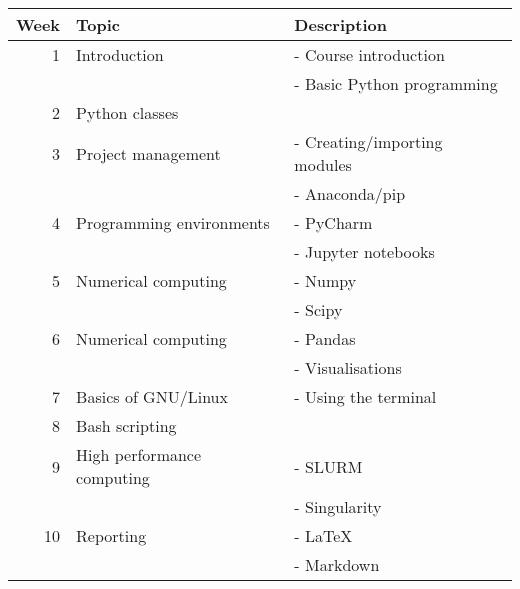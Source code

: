 \documentclass[11pt]{article}
\begin{document}
\begin{center}
\begin{tabular}{rll}
\hline
Week & Topic & Description\\
\hline
1 & Introduction & - Course introduction\\
 &  & - Basic Python programming\\
2 & Python classes & \\
3 & Project management & - Creating/importing modules\\
 &  & - Anaconda/pip\\
4 & Programming environments & - PyCharm\\
 &  & - Jupyter notebooks\\
5 & Numerical computing & - Numpy\\
 &  & - Scipy\\
6 & Numerical computing & - Pandas\\
 &  & - Visualisations\\
7 & Basics of GNU/Linux & - Using the terminal\\
8 & Bash scripting & \\
9 & High performance computing & - SLURM\\
 &  & - Singularity\\
10 & Reporting & - \LaTeX{}\\
 &  & - Markdown\\
\hline
\end{tabular}
\end{center}
\end{document}
